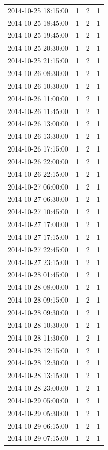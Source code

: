 \begin{tabular}{lrrr}
2014-10-25 18:15:00 & 1 & 2 & 1 \\
2014-10-25 18:45:00 & 1 & 2 & 1 \\
2014-10-25 19:45:00 & 1 & 2 & 1 \\
2014-10-25 20:30:00 & 1 & 2 & 1 \\
2014-10-25 21:15:00 & 1 & 2 & 1 \\
2014-10-26 08:30:00 & 1 & 2 & 1 \\
2014-10-26 10:30:00 & 1 & 2 & 1 \\
2014-10-26 11:00:00 & 1 & 2 & 1 \\
2014-10-26 11:45:00 & 1 & 2 & 1 \\
2014-10-26 13:00:00 & 1 & 2 & 1 \\
2014-10-26 13:30:00 & 1 & 2 & 1 \\
2014-10-26 17:15:00 & 1 & 2 & 1 \\
2014-10-26 22:00:00 & 1 & 2 & 1 \\
2014-10-26 22:15:00 & 1 & 2 & 1 \\
2014-10-27 06:00:00 & 1 & 2 & 1 \\
2014-10-27 06:30:00 & 1 & 2 & 1 \\
2014-10-27 10:45:00 & 1 & 2 & 1 \\
2014-10-27 17:00:00 & 1 & 2 & 1 \\
2014-10-27 17:15:00 & 1 & 2 & 1 \\
2014-10-27 22:45:00 & 1 & 2 & 1 \\
2014-10-27 23:15:00 & 1 & 2 & 1 \\
2014-10-28 01:45:00 & 1 & 2 & 1 \\
2014-10-28 08:00:00 & 1 & 2 & 1 \\
2014-10-28 09:15:00 & 1 & 2 & 1 \\
2014-10-28 09:30:00 & 1 & 2 & 1 \\
2014-10-28 10:30:00 & 1 & 2 & 1 \\
2014-10-28 11:30:00 & 1 & 2 & 1 \\
2014-10-28 12:15:00 & 1 & 2 & 1 \\
2014-10-28 12:30:00 & 1 & 2 & 1 \\
2014-10-28 13:15:00 & 1 & 2 & 1 \\
2014-10-28 23:00:00 & 1 & 2 & 1 \\
2014-10-29 05:00:00 & 1 & 2 & 1 \\
2014-10-29 05:30:00 & 1 & 2 & 1 \\
2014-10-29 06:15:00 & 1 & 2 & 1 \\
2014-10-29 07:15:00 & 1 & 2 & 1 \\

\end{tabular}
